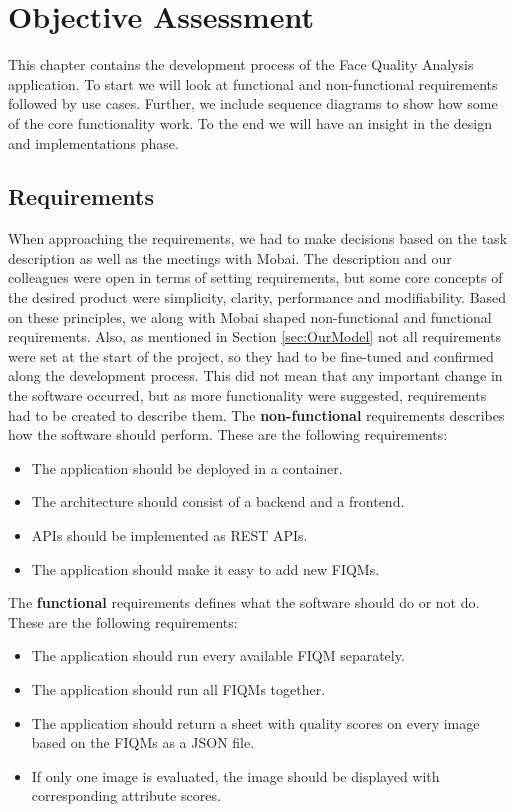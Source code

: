 \chapter{Objective Assessment}
\label{chap:objective}
This chapter contains the development process of the Face Quality Analysis application. To start we will look at functional and non-functional requirements followed by use cases. Further, we include sequence diagrams to show how some of the core functionality work. To the end we will have an insight in the design and implementations phase.

\section{Requirements}
\label{sec:requirements}
When approaching the requirements, we had to make decisions based on the task description as well as the meetings with Mobai. The description and our colleagues were open in terms of setting requirements, but some core concepts of the desired product were simplicity, clarity, performance and modifiability. Based on these principles, we along with Mobai shaped non-functional and functional requirements. Also, as mentioned in Section \ref{sec:OurModel} not all requirements were set at the start of the project, so they had to be fine-tuned and confirmed along the development process. This did not mean that any important change in the software occurred, but as more functionality were suggested, requirements had to be created to describe them. The \textbf{non-functional} requirements describes how the software should perform. These are the following requirements:
\begin{itemize}
    \item The application should be deployed in a container.
    \item The architecture should consist of a backend and a frontend.
    \item APIs should be implemented as REST APIs.
    \item The application should make it easy to add new FIQMs.
\end{itemize}
The \textbf{functional} requirements defines what the software should do or not do. These are the following requirements:
\begin{itemize}
    \item The application should run every available FIQM separately.
    \item The application should run all FIQMs together.
    \item The application should return a sheet with quality scores on every image based on the FIQMs as a JSON file.
    \item If only one image is evaluated, the image should be displayed with corresponding attribute scores. 
\end{itemize}

